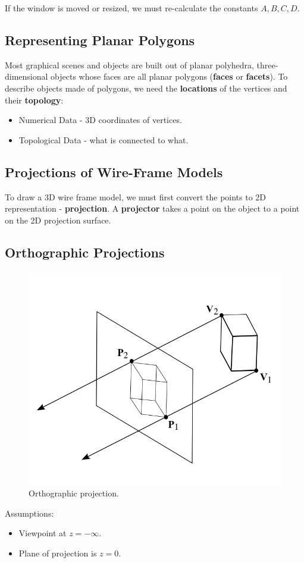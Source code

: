 \documentclass[11pt]{article}
\begin{document}
If the window is moved or resized, we must re-calculate the constants $A, B, C, D$.

\subsection{Representing Planar Polygons}
Most graphical scenes and objects are built out of planar polyhedra, three-dimensional objects whose faces are all planar polygons (\textbf{faces} or \textbf{facets}).
To describe objects made of polygons, we need the \textbf{locations} of the vertices and their \textbf{topology}:
\begin{itemize}
  \item Numerical Data - 3D coordinates of vertices.
  \item Topological Data - what is connected to what.
\end{itemize}

\subsection{Projections of Wire-Frame Models}
To draw a 3D wire frame model, we must first convert the points to 2D representation - \textbf{projection}.
A \textbf{projector} takes a point on the object to a point on the 2D projection surface.

\subsection{Orthographic Projections}
\begin{figure}[htb!]
  \caption{Orthographic projection.}
  \includegraphics[scale=0.3]{parallel}
  \centering
\end{figure}
Assumptions:
\begin{itemize}
  \item Viewpoint at $z = - \infty$.
  \item Plane of projection is $z = 0$.
\end{itemize}
\end{document}
